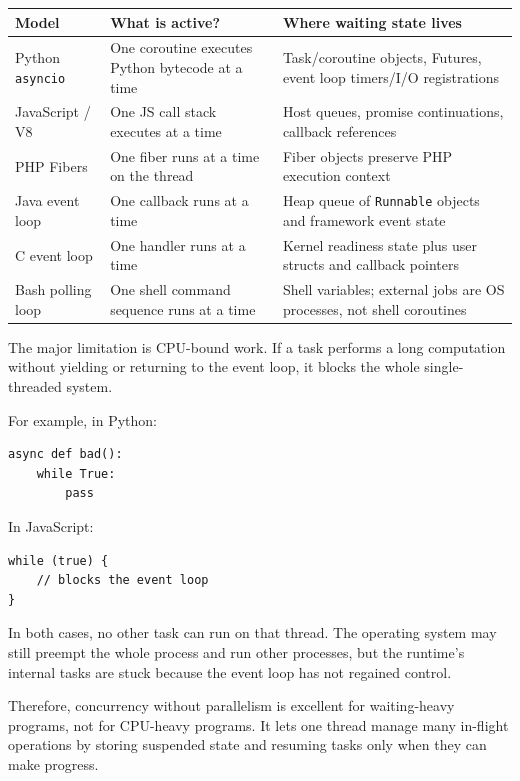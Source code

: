 \begin{center}
\begin{tabular}{|p{}|p{}|p{}|}
\hline
\textbf{Model} & \textbf{What is active?} & \textbf{Where waiting state lives} \\
\hline
Python \texttt{asyncio} & One coroutine executes Python bytecode at a time & Task/coroutine objects, Futures, event loop timers/I/O registrations \\
\hline
JavaScript / V8 & One JS call stack executes at a time & Host queues, promise continuations, callback references \\
\hline
PHP Fibers & One fiber runs at a time on the thread & Fiber objects preserve PHP execution context \\
\hline
Java event loop & One callback runs at a time & Heap queue of \texttt{Runnable} objects and framework event state \\
\hline
C event loop & One handler runs at a time & Kernel readiness state plus user structs and callback pointers \\
\hline
Bash polling loop & One shell command sequence runs at a time & Shell variables; external jobs are OS processes, not shell coroutines \\
\hline
\end{tabular}
\end{center}

The major limitation is CPU-bound work. If a task performs a long computation without yielding or returning to the event loop, it blocks the whole single-threaded system.

For example, in Python:

\begin{verbatim}
async def bad():
    while True:
        pass
\end{verbatim}

In JavaScript:

\begin{verbatim}
while (true) {
    // blocks the event loop
}
\end{verbatim}

In both cases, no other task can run on that thread. The operating system may still preempt the whole process and run other processes, but the runtime's internal tasks are stuck because the event loop has not regained control.

Therefore, concurrency without parallelism is excellent for waiting-heavy programs, not for CPU-heavy programs. It lets one thread manage many in-flight operations by storing suspended state and resuming tasks only when they can make progress.



